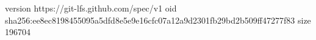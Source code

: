 version https://git-lfs.github.com/spec/v1
oid sha256:ee8ec8198455095a5dfd8e5e9e16cfc07a12a9d2301fb29bd2b509ff47277f83
size 196704
